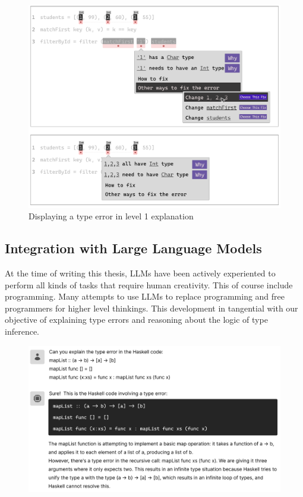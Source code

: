 \begin{figure}[hbt]
  \includegraphics[width=\linewidth]{WhatIf}
  \caption{
      Displaying a type error in level 1 explanation
    }
\end{figure}


\subsection{Integration with Large Language Models}
At the time of writing this thesis, LLMs have been actively experiented to perform all kinds of tasks that require human creativity. This of course include programming. Many attempts to use LLMs to replace programming and free programmers for higher level thinkings. This development in tangential with our objective of explaining type errors and reasoning about the logic of type inference. 

\begin{figure}[hbt]
  \includegraphics[width=\linewidth]{LLM}
  \caption{\label{fig:llm}
    }
\end{figure}

